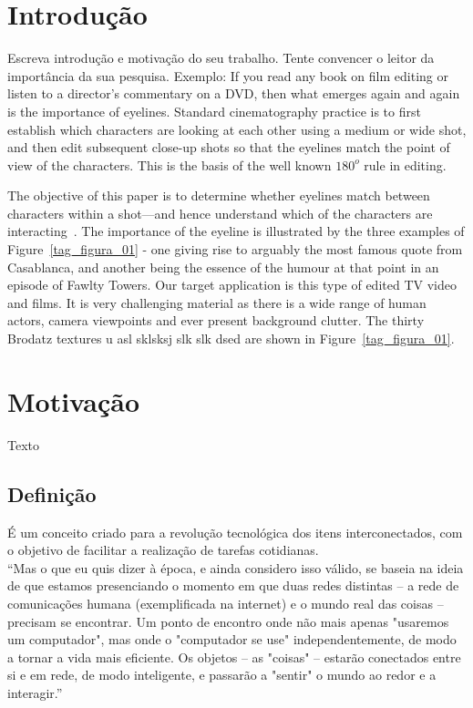 \documentclass{classe_cn}                 %
\begin{document}
\section{Introdução}

Escreva introdução e motivação do seu trabalho. Tente convencer o leitor da importância da sua pesquisa. Exemplo: If you read any book on film editing or listen to a director's commentary on a DVD, then what emerges again and again is the importance of eyelines. Standard cinematography practice is to first establish which characters are looking at each other using a medium or wide shot, and then edit subsequent close-up shots so that the eyelines match the point of view of the characters. This is the basis of the well known $180^{o}$ rule in editing.

The objective of this paper is to determine whether eyelines match between characters within a shot—and hence understand which of the characters are interacting~\cite{Pressman:2007}. The importance of the eyeline is illustrated by the three examples of Figure~\ref{tag_figura_01} - one giving rise to arguably the most famous quote from Casablanca, and another being the essence of the humour at that point in an episode of Fawlty Towers. Our target application is this type of edited TV video and films. It is very challenging material as there is a wide range of human actors, camera viewpoints and ever present background clutter. The thirty Brodatz textures u asl sklsksj slk slk dsed are shown in Figure~\ref{tag_figura_01}.


\section{Motivação}
Texto

\subsection{Definição} %
É um conceito criado para a revolução tecnológica dos itens interconectados, 
com o objetivo de facilitar a realização de tarefas cotidianas.\\

“Mas o que eu quis dizer à época, e ainda considero isso válido, se baseia 
na ideia de que estamos presenciando o momento em que duas redes distintas – 
a rede de comunicações humana (exemplificada na internet) e o mundo real das coisas – 
precisam se encontrar. Um ponto de encontro onde não mais apenas "usaremos um 
computador", mas onde o "computador se use" independentemente, de modo a tornar a
vida mais eficiente. Os objetos – as "coisas" – estarão conectados entre si e em rede, 
de modo inteligente, e passarão a "sentir" o mundo ao redor e a interagir.”\\  
\end{document}
